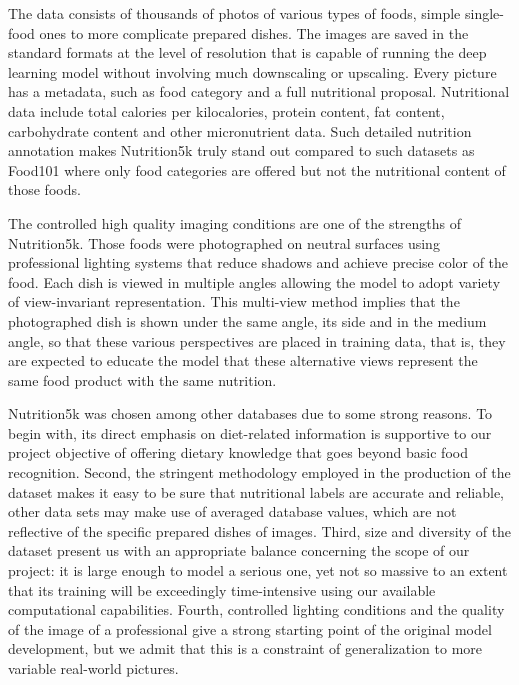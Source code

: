 \documentclass[12pt, openany]{report}
\begin{document}
The data consists of thousands of photos of various types of foods, simple single-food ones to more complicate prepared dishes. The images are saved in the standard formats at the level of resolution that is capable of running the deep learning model without involving much downscaling or upscaling. Every picture has a metadata, such as food category and a full nutritional proposal. Nutritional data include total calories per kilocalories, protein content, fat content, carbohydrate content and other micronutrient data. Such detailed nutrition annotation makes Nutrition5k truly stand out compared to such datasets as Food101 where only food categories are offered but not the nutritional content of those foods.\pagebreak

The controlled high quality imaging conditions are one of the strengths of Nutrition5k. Those foods were photographed on neutral surfaces using professional lighting systems that reduce shadows and achieve precise color of the food. Each dish is viewed in multiple angles allowing the model to adopt variety of view-invariant representation. This multi-view method implies that the photographed dish is shown under the same angle, its side and in the medium angle, so that these various perspectives are placed in training data, that is, they are expected to educate the model that these alternative views represent the same food product with the same nutrition.

Nutrition5k was chosen among other databases due to some strong reasons. To begin with, its direct emphasis on diet-related information is supportive to our project objective of offering dietary knowledge that goes beyond basic food recognition. Second, the stringent methodology employed in the production of the dataset makes it easy to be sure that nutritional labels are accurate and reliable, other data sets may make use of averaged database values, which are not reflective of the specific prepared dishes of images. Third, size and diversity of the dataset present us with an appropriate balance concerning the scope of our project: it is large enough to model a serious one, yet not so massive to an extent that its training will be exceedingly time-intensive using our available computational capabilities. Fourth, controlled lighting conditions and the quality of the image of a professional give a strong starting point of the original model development, but we admit that this is a constraint of generalization to more variable real-world pictures.
\end{document}
